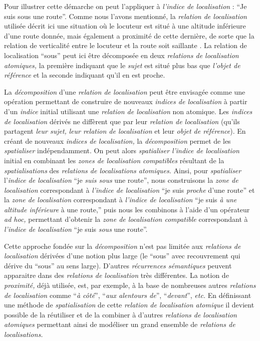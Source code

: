 Pour illustrer cette démarche on peut l'appliquer à \emph{l'indice de
  localisation} : \enquote{Je suis sous une route}. Comme nous l'avons
mentionné, la \emph{relation de localisation} utilisée décrit ici une
situation où le locuteur est situé à une altitude inférieure d'une
route donnée, mais également a proximité de cette dernière, de sorte
que la relation de verticalité entre le locuteur et la route soit
saillante \autocite{Vandeloise1986}. La relation de localisation
\enquote{sous} peut ici être décomposée en deux \emph{relations de
  localisation atomiques,} la première indiquant que le \emph{sujet}
est situé plus bas que \emph{l'objet de référence} et la seconde
indiquant qu'il en est proche.

La \emph{décomposition} d'une \emph{relation de localisation} peut
être envisagée comme une opération permettant de construire de
nouveaux \emph{indices de localisation} à partir d'un \emph{indice}
initial utilisant une \emph{relation de localisation} non
atomique. Les \emph{indices de localisation} dérivés ne diffèrent que
par leur \emph{relation de localisation} (\ie qu'ils partagent
\emph{leur sujet,} \emph{leur relation de localisation} et leur
\emph{objet de référence}). En créant de nouveaux \emph{indices de
  localisation,} la \emph{décomposition} permet de les
\emph{spatialiser} indépendamment. On peut alors \emph{spatialiser}
\emph{l'indice de localisation} initial en combinant les \emph{zones
  de localisation compatibles} résultant de la \emph{spatialisations}
des \emph{relations de localisations atomiques.} Ainsi, pour
\emph{spatialiser} l'\emph{indice de localisation} \enquote{je
  \emph{suis sous} une route}, nous construisons la \emph{zone de
  localisation} correspondant à \emph{l'indice de localisation}
\enquote{je suis \emph{proche} d'une route} et la \emph{zone de
  localisation} correspondant à \emph{l'indice de localisation}
\enquote{je suis \emph{à une altitude inférieure} à une route,} puis
nous les combinons à l'aide d'un opérateur \emph{ad hoc,} permettant
d'obtenir la \emph{zone de localisation compatible} correspondant à
\emph{l'indice de localisation} \enquote{je suis \emph{sous} une
  route}.

Cette approche fondée sur la \emph{décomposition} n'est pas limitée
aux \emph{relations de localisation} dérivées d'une notion plus large
(\eg le \enquote{sous} avec recouvrement qui dérive du \enquote{sous}
au sens large). D'autres \emph{récurrences sémantiques} peuvent
apparaitre dans des \emph{relations de localisation} très
différentes. La notion de \emph{proximité,} déjà utilisée, est, par
exemple, à la base de nombreuses autres \emph{relations de
  localisation} comme \enquote{\emph{à côté}}, \enquote{\emph{aux
    alentours de}}, \enquote{\emph{devant}}, \emph{etc.} En
définissant une méthode de \emph{spatialisation} de cette
\emph{relation de localisation atomique} il devient possible de la
réutiliser et de la combiner à d'autres \emph{relations de
  localisation atomiques} permettant ainsi de modéliser un grand
ensemble de \emph{relations de localisations.}

